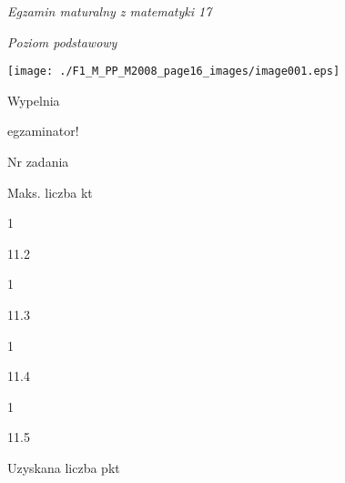 \documentclass[a4paper,12pt]{article}
\begin{document}
{\it Egzamin maturalny z matematyki 17}

{\it Poziom podstawowy}
\begin{center}
\texttt{[image: ./F1\_M\_PP\_M2008\_page16\_images/image001.eps]}
\end{center}
Wypelnia

egzaminator!

Nr zadania

Maks. liczba kt

1

11.2

1

11.3

1

11.4

1

11.5

Uzyskana liczba pkt
\end{document}
